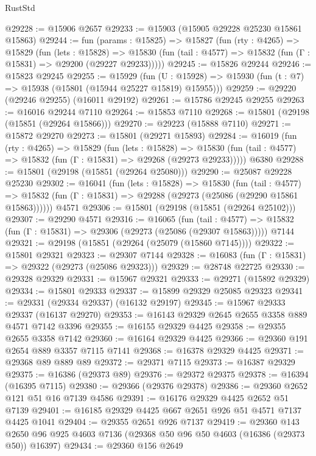 \begin{lexlean}{RustStd}
\begin{coremodule}
@29228 := @15906 @2657
@29233 := @15903 (@15905 @29228 @25230 @15861 @15863)
@29244 := fun (params : @15825) =>
  @15827
    (fun (rty : @4265) =>
    @15829
      (fun (lets : @15828) =>
      @15830 (fun (tail : @4577) => @15832 (fun (Γ : @15831) => @29200 (@29227 @29233)))))
@29245 := @15826 @29244
@29246 := @15823 @29245
@29255 := @15929
    (fun (U : @15928) => @15930 (fun (t : @7) => @15938 (@15801 (@15944 @25227 @15819) @15955)))
@29259 := @29220 (@29246 @29255) (@16011 @29192)
@29261 := @15786 @29245 @29255
@29263 := @16016 @29244 @7110
@29264 := @15853 @7110
@29268 := @15801 (@29198 (@15851 (@29264 @15866)))
@29270 := @29223 (@15888 @7110)
@29271 := @15872 @29270
@29273 := @15801 (@29271 @15893)
@29284 := @16019
    (fun (rty : @4265) =>
    @15829
      (fun (lets : @15828) =>
      @15830 (fun (tail : @4577) => @15832 (fun (Γ : @15831) => @29268 (@29273 @29233)))))
    @6380
@29288 := @15801 (@29198 (@15851 (@29264 @25080)))
@29290 := @25087 @29228 @25230
@29302 := @16041
    (fun (lets : @15828) =>
    @15830
      (fun (tail : @4577) =>
      @15832 (fun (Γ : @15831) => @29288 (@29273 (@25086 (@29290 @15861 @15863))))))
    @4571
@29306 := @15801 (@29198 (@15851 (@29264 @25102)))
@29307 := @29290 @4571
@29316 := @16065
    (fun (tail : @4577) => @15832 (fun (Γ : @15831) => @29306 (@29273 (@25086 (@29307 @15863)))))
    @7144
@29321 := @29198 (@15851 (@29264 (@25079 (@15860 @7145))))
@29322 := @15801 @29321
@29323 := @29307 @7144
@29328 := @16083 (fun (Γ : @15831) => @29322 (@29273 (@25086 @29323)))
@29329 := @28748 @22725
@29330 := @29328 @29329
@29331 := @15967 @29321
@29333 := @29271 (@15892 @29329)
@29334 := @15801 @29333
@29337 := @15899 @29329 @25085 @29323
@29341 := @29331 (@29334 @29337) (@16132 @29197)
@29345 := @15967 @29333 @29337 (@16137 @29270)
@29353 := @16143 @29329 @2645 @2655 @3358 @889 @4571 @7142 @3396
@29355 := @16155 @29329 @4425
@29358 := @29355 @2655 @3358 @7142
@29360 := @16164 @29329 @4425
@29366 := @29360 @191 @2654 @889 @3357 @7115 @7141
@29368 := @16378 @29329 @4425
@29371 := @29368 @89 @889 @89
@29372 := @29371 @7115
@29373 := @16387 @29329
@29375 := @16386 (@29373 @89)
@29376 := @29372 @29375
@29378 := @16394 (@16395 @7115)
@29380 := @29366 (@29376 @29378)
@29386 := @29360 @2652 @121 @51 @16 @7139 @4586
@29391 := @16176 @29329 @4425 @2652 @51 @7139
@29401 := @16185 @29329 @4425 @667 @2651 @926 @51 @4571 @7137 @4425 @1041
@29404 := @29355 @2651 @926 @7137
@29419 := @29360
    @143
    @2650
    @96
    @925
    @4603
    @7136
    (@29368 @50 @96 @50 @4603 (@16386 (@29373 @50)) @16397)
@29434 := @29360
    @156
    @2649

\end{coremodule}
\end{lexlean}
